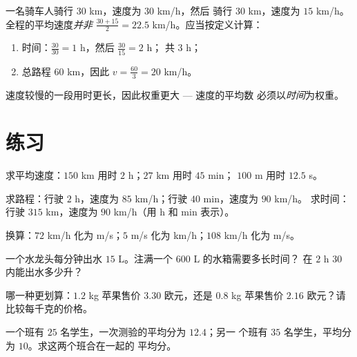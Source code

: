 \begin{example}[两段行程的平均速度]\label{ex:g8:speed:twolegs}
一名骑车人骑行 $30$ km，速度为 $30$ km/h，然后
骑行 $30$ km，速度为 $15$ km/h。全程的平均速度\emph{并非}
$\frac{30 + 15}{2} = 22.5$ km/h。应当按定义计算：
\begin{enumerate}
  \item 时间：$\frac{30}{30} = 1$ h，然后 $\frac{30}{15} = 2$ h；
        共 $3$ h；
  \item 总路程 $60$ km，因此
        $v = \frac{60}{3} = 20$ km/h。
\end{enumerate}
速度较慢的一段用时更长，因此权重更大 --- 速度的平均数
必须以\emph{时间}为权重。
\end{example}

\section{练习}

\begin{exercise}[$\star$]\label{exo:g8:speed:1}
求平均速度：$150$ km 用时 $2$ h；$27$ km 用时 $45$ min；
$100$ m 用时 $12.5$ s。
\end{exercise}

\begin{exercise}[$\star$]\label{exo:g8:speed:2}
求路程：行驶 $2$ h，速度为 $85$ km/h；行驶 $40$ min，速度为 $90$ km/h。
求时间：行驶 $315$ km，速度为 $90$ km/h（用 h 和 min 表示）。
\end{exercise}

\begin{exercise}[$\star$]\label{exo:g8:speed:3}
换算：$72$ km/h 化为 m/s；$5$ m/s 化为 km/h；$108$ km/h 化为 m/s。
\end{exercise}

\begin{exercise}[$\star$]\label{exo:g8:speed:4}
一个水龙头每分钟出水 $15$ L。注满一个 $600$ L 的水箱需要多长时间？
在 $2$ h $30$ 内能出水多少升？
\end{exercise}

\begin{exercise}[$\star$]\label{exo:g8:speed:5}
哪一种更划算：$1.2$ kg 苹果售价 $3.30$ 欧元，还是
$0.8$ kg 苹果售价 $2.16$ 欧元？请比较每千克的价格。
\end{exercise}

\begin{exercise}[$\star$]\label{exo:g8:speed:6}
一个班有 $25$ 名学生，一次测验的平均分为 $12.4$；另一
个班有 $35$ 名学生，平均分为 $10$。求这两个班合在一起的
平均分。
\end{exercise}

